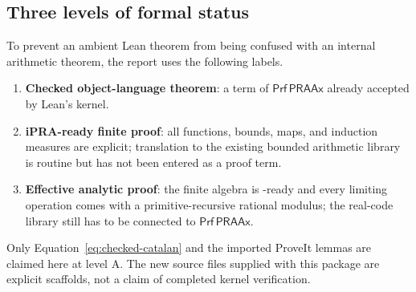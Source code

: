 \subsection{Three levels of formal status}

To prevent an ambient Lean theorem from being confused with an internal
arithmetic theorem, the report uses the following labels.

\begin{enumerate}[label=\textbf{\Alph*.},leftmargin=2.4em]
\item \textbf{Checked object-language theorem}: a term of
      \(\mathsf{Prf}\,\mathsf{PRAAx}\) already accepted by Lean's kernel.
\item \textbf{iPRA-ready finite proof}: all functions, bounds, maps, and
      induction measures are explicit; translation to the existing bounded
      arithmetic library is routine but has not been entered as a proof term.
\item \textbf{Effective analytic proof}: the finite algebra is \ipra-ready
      and every limiting operation comes with a primitive-recursive rational
      modulus; the real-code library still has to be connected to
      \(\mathsf{Prf}\,\mathsf{PRAAx}\).
\end{enumerate}

Only Equation~\eqref{eq:checked-catalan} and the imported ProveIt lemmas are
claimed here at level A.  The new source files supplied with this package are
explicit scaffolds, not a claim of completed kernel verification.
